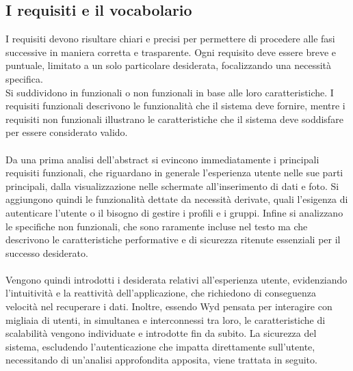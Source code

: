 \subsection{I requisiti e il vocabolario}
I requisiti devono risultare chiari e precisi
per permettere di procedere alle fasi successive in maniera corretta e trasparente.
Ogni requisito deve essere breve e puntuale, limitato a un solo particolare desiderata,
focalizzando una necessità specifica.\\
Si suddividono in funzionali o non funzionali in base alle loro caratteristiche.
I requisiti funzionali descrivono le funzionalità che il sistema deve fornire,
mentre i requisiti non funzionali illustrano le caratteristiche che il sistema deve soddisfare per essere considerato valido.\\
\\
Da una prima analisi dell'abstract si evincono immediatamente i principali requisiti funzionali,
che riguardano in generale l'esperienza utente nelle sue parti principali,
dalla visualizzazione nelle schermate all'inserimento di dati e foto.
Si aggiungono quindi le funzionalità dettate da necessità derivate,
quali l'esigenza di autenticare l'utente o il bisogno di gestire i profili e i gruppi.
Infine si analizzano le specifiche non funzionali,
che sono raramente incluse nel testo ma che descrivono le caratteristiche performative e di sicurezza
ritenute essenziali per il successo desiderato.\\
\\
Vengono quindi introdotti i desiderata relativi all'esperienza utente,
evidenziando l'intuitività e la reattività dell'applicazione,
che richiedono di conseguenza velocità nel recuperare i dati.
Inoltre, essendo Wyd pensata per interagire con migliaia di utenti,
in simultanea e interconnessi tra loro, le caratteristiche di scalabilità vengono individuate e introdotte fin da subito.
La sicurezza del sistema, escludendo l'autenticazione che impatta direttamente sull'utente,
necessitando di un'analisi approfondita apposita, viene trattata in seguito.\\

